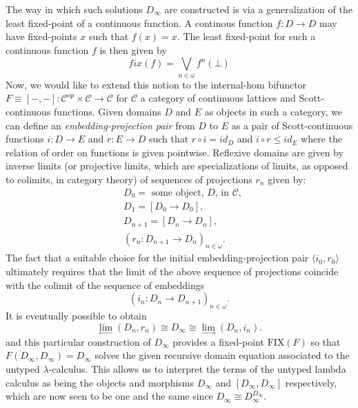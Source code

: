 The way in which such solutions $D_\infty$ are constructed is via a generalization of the least fixed-point of a continuous function. A continous function $f \colon D \rightarrow D$ may have fixed-points $x$ such that $f(x)=x$. The least fixed-point for such a continuous function $f$ is then given by
$$
fix(f) = \bigvee_{n \in \omega} f^n(\bot)
$$
Now, we would like to extend this notion to the internal-hom bifunctor $F \equiv [-,-] \colon \mathcal{C}^{op} \times \mathcal{C} \rightarrow \mathcal{C}$ for $\mathcal{C}$ a category of continuous lattices and Scott-continuous functions. Given domains $D$ and $E$ as objects in such a category, we can define an \emph{embedding-projection pair} from $D$ to $E$ as a pair of Scott-continuous functions $i \colon D \rightarrow E$ and $r \colon E \rightarrow D$ such that $r \circ i = id_D$ and $i \circ r \leq id_E$ where the relation of order on functions is given pointwise. Reflexive domains are given by inverse limits (or projective limits, which are specializations of limits, as opposed to colimits, in category theory) of sequences of projections $r_n$ given by:
\begin{align*}
&D_0 = \mbox{ some object, $D$, in } \mathcal{C},\\
&D_1 = [D_0 \rightarrow D_0],\\
&D_{n+1} = [D_n \rightarrow D_n],\\
&(r_n \colon D_{n+1} \rightarrow D_n)_{n \in \omega}.
\end{align*}
The fact that a suitable choice for the initial embedding-projection pair $\langle i_0, r_0 \rangle$ ultimately requires that the limit of the above sequence of projections coincide with the colimit of the sequence of embeddings
$$
(i_n \colon D_{n} \rightarrow D_{n+1})_{n \in \omega}.
$$
It is eventually possible to obtain
$$
\lim_{\leftarrow} (D_n, r_n) \cong D_\infty \cong \lim_{\rightarrow} (D_n, i_n).
$$
and this particular construction of $D_{\infty}$ provides a fixed-point $\text{FIX}(F)$ so that $F(D_{\infty},D_{\infty}) = D_{\infty}$ solves the given recursive domain equation associated to the untyped $\lambda$-calculus. This allows us to interpret the terms of the untyped lambda calculus as being the objects and morphisms $D_{\infty}$ and $[D_{\infty},D_{\infty}]$ respectively, which are now seen to be one and the same since $D_{\infty} \cong D_{\infty}^{D_{\infty}}$.

